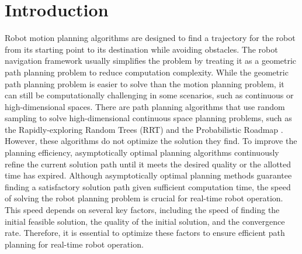 \section{Introduction}

Robot motion planning algorithms are designed to find a trajectory for the robot from its starting point to its destination while avoiding obstacles. 
The robot navigation framework usually simplifies the problem by treating it as a geometric path planning problem to reduce computation complexity. 
While the geometric path planning problem is easier to solve than the motion planning problem, it can still be computationally challenging in some scenarios, such as continuous or high-dimensional spaces.
There are path planning algorithms that use random sampling to solve high-dimensional continuous space planning problems, such as the Rapidly-exploring Random Trees (RRT) \cite{lavalle1998rapidly} and the Probabilistic Roadmap \cite{kavraki1996probabilistic}.
However, these algorithms do not optimize the solution they find. 
To improve the planning efficiency, asymptotically optimal planning algorithms continuously refine the current solution path until it meets the desired quality or the allotted time has expired. 
Although asymptotically optimal planning methods guarantee finding a satisfactory solution path given sufficient computation time, the speed of solving the robot planning problem is crucial for real-time robot operation. 
This speed depends on several key factors, including the speed of finding the initial feasible solution, the quality of the initial solution, and the convergence rate. 
Therefore, it is essential to optimize these factors to ensure efficient path planning for real-time robot operation.


